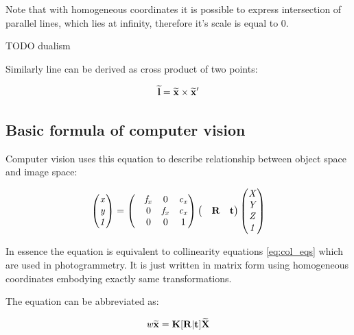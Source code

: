 \documentclass[a4paper,12pt]{report}
\newcommand{\ematr}[1]{
{\bf #1}
}
\newcommand{\evect}[1]{
{\bf #1}
}
\newcommand{\ehvect}[1]{
{\bf \widetilde{#1}}
}
\newcommand{\escal}[1]{
{\it #1}
}
\begin{document}
Note that with homogeneous coordinates it is possible to express intersection of parallel lines, which lies at infinity, 
therefore it's scale is equal to 0.

TODO dualism

Similarly line can be derived as cross product of two points:

\begin{equation}
\ehvect{l} = \ehvect{x} \times \ehvect{x}'
\end{equation}


\subsection{Basic formula of computer vision}

Computer vision uses this equation to describe relationship between
object space and image space:

\begin{equation}
\begin{pmatrix}
   \escal{x} \\
   \escal{y} \\
   \escal{1} \\
\end{pmatrix}
=
\begin{pmatrix}
   & \escal{f_{x}} & 0     & \escal{c_{x}}\\
   & 0     & \escal{f_{x}} & \escal{c_{x}}\\
   & 0     & 0     & 1\\
\end{pmatrix}
\begin{pmatrix}
   &\ematr{R} & \evect{t}\\
\end{pmatrix}
\begin{pmatrix}
   \escal{X} \\
   \escal{Y} \\
   \escal{Z} \\
   \escal{1} \\
\end{pmatrix}
\end{equation}

In essence the equation is equivalent to collinearity equations \eqref{eq:col_eqs} which are used in photogrammetry.
It is just written in matrix form using homogeneous coordinates embodying exactly same transformations.

The equation can be abbreviated as:

\begin{equation}
\escal{w} \ehvect{x} = \ematr{K} \ematr{[}\ematr{R}|\evect{t}\ematr{]} \ehvect{X}
\label{eq:p_exp}
\end{equation}
\end{document}
